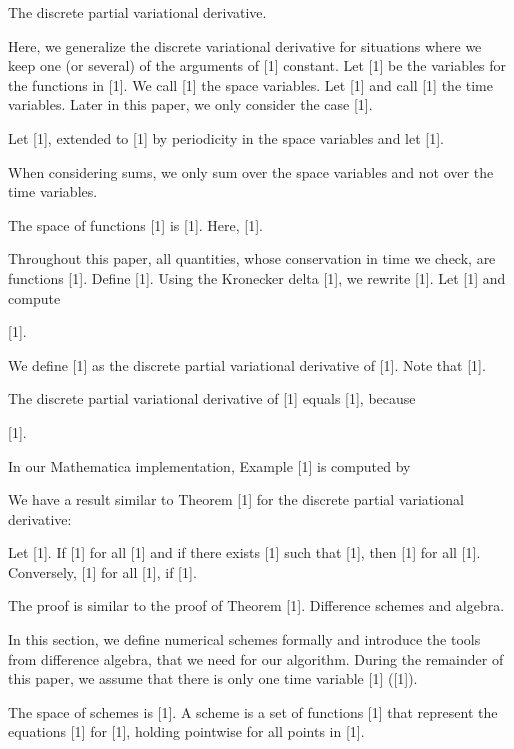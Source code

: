 \documentclass{article}
\begin{document}
The discrete partial variational derivative.



Here, we generalize the discrete variational derivative for situations where we keep one (or several) of the arguments of [1] constant.
Let [1] be the variables for the functions in [1]. We call [1] the space variables. Let [1] and call [1] the time variables. Later in this paper, we only consider the case [1].

	Let [1], extended to [1] by periodicity in the space variables and let [1].

When considering sums, we only sum over the space variables and not over the time variables.

	
	The space of functions [1] is
	[1].
Here, [1].

Throughout this paper, all quantities, whose conservation in time we check, are functions [1]. 
Define [1]. Using the Kronecker delta [1], we rewrite
[1].
	Let [1] and compute
	
	[1].
	
	
	We define [1] as the discrete partial variational derivative of [1].
	Note that [1].


	
	The discrete partial variational derivative of 
	[1]
	equals [1], because
	
	[1].
	


	In our {Mathematica} implementation, Example [1] is computed by
		
	
		
		
	

We have a result similar to Theorem [1] for the discrete partial variational derivative:

	Let [1]. If [1] for all [1] and if there exists [1] such that [1], then
	[1]
	for all [1].
	Conversely,
	[1]
	for all [1], if [1].

The proof is similar to the proof of Theorem [1].
Difference schemes and algebra.



In this section, we define numerical schemes formally and introduce the tools from difference algebra, that we need for our algorithm.
During the remainder of this paper, we assume that there is only one time variable [1] ([1]).

	The space of schemes is
	[1].
	A scheme is a set of functions
	[1]
	that represent the equations [1] for [1], holding pointwise for all points in [1].
\end{document}
